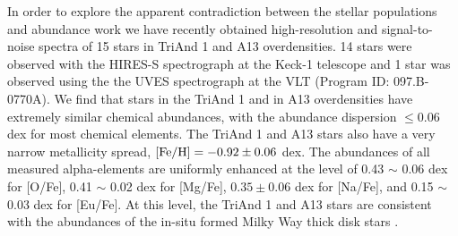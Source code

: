 \documentclass[galaxies,article,submit,moreauthors,pdftex,10pt,a4paper]{mdpi}
\begin{document}
In order to explore the apparent contradiction between the stellar populations and abundance work we have recently obtained high-resolution and signal-to-noise spectra of 15 stars in TriAnd 1 and A13 overdensities. 14 stars were observed with the HIRES-S spectrograph at the Keck-1 telescope \cite{vogt1994} and 1 star was observed using the the UVES spectrograph at the VLT (Program ID: 097.B-0770A).
We find that stars in the TriAnd 1 and in A13 overdensities have extremely similar chemical abundances, with the abundance dispersion $\leq 0.06$ dex for most chemical elements. The TriAnd 1 and A13 stars also have a very narrow metallicity spread,  ${\rm [Fe/H]} = -0.92 \pm 0.06$ dex. The abundances of all measured alpha-elements are uniformly enhanced at the level of 0.43 $\sim$ 0.06 dex for [O/Fe], 0.41 $\sim$ 0.02 dex for [Mg/Fe], $0.35 \pm 0.06$ dex for [Na/Fe], and 0.15 $\sim$ 0.03 dex for [Eu/Fe]. At this level, the TriAnd 1 and A13 stars are consistent with the abundances of the in-situ formed Milky Way thick disk stars \cite{fuhrmann2004,bergemann2014,bensby2014}.
\end{document}
